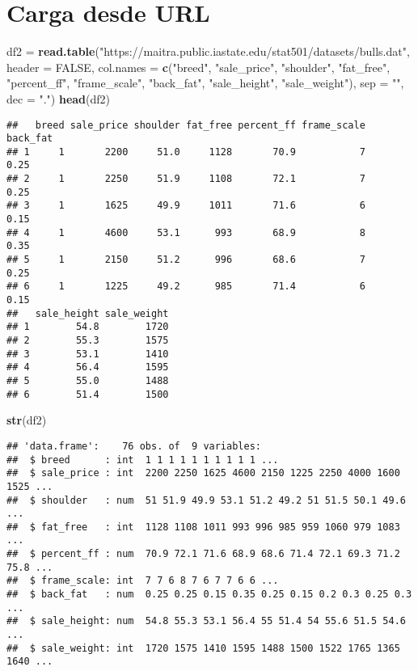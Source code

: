 \documentclass[
]{article}
\newenvironment{Shaded}{\begin{snugshade}}{\end{snugshade}}
\newcommand{\DataTypeTok}[1]{\textcolor[rgb]{0.13,0.29,0.53}{#1}}
\newcommand{\KeywordTok}[1]{\textcolor[rgb]{0.13,0.29,0.53}{\textbf{#1}}}
\newcommand{\NormalTok}[1]{#1}
\newcommand{\OtherTok}[1]{\textcolor[rgb]{0.56,0.35,0.01}{#1}}
\newcommand{\StringTok}[1]{\textcolor[rgb]{0.31,0.60,0.02}{#1}}
\begin{document}
\hypertarget{carga-desde-url}{%
\section{Carga desde URL}\label{carga-desde-url}}

\begin{Shaded}
\begin{Highlighting}[]
\NormalTok{df2 =}\StringTok{ }\KeywordTok{read.table}\NormalTok{(}\StringTok{"https://maitra.public.iastate.edu/stat501/datasets/bulls.dat"}\NormalTok{,}
                 \DataTypeTok{header =} \OtherTok{FALSE}\NormalTok{, }
                \DataTypeTok{col.names =} \KeywordTok{c}\NormalTok{(}\StringTok{"breed"}\NormalTok{, }\StringTok{"sale_price"}\NormalTok{, }\StringTok{"shoulder"}\NormalTok{,}
                          \StringTok{"fat_free"}\NormalTok{, }\StringTok{"percent_ff"}\NormalTok{, }\StringTok{"frame_scale"}\NormalTok{,}
                          \StringTok{"back_fat"}\NormalTok{, }\StringTok{"sale_height"}\NormalTok{, }\StringTok{"sale_weight"}\NormalTok{),}
                \DataTypeTok{sep =} \StringTok{""}\NormalTok{, }\DataTypeTok{dec =} \StringTok{"."}\NormalTok{)}
\KeywordTok{head}\NormalTok{(df2)}
\end{Highlighting}
\end{Shaded}

\begin{verbatim}
##   breed sale_price shoulder fat_free percent_ff frame_scale back_fat
## 1     1       2200     51.0     1128       70.9           7     0.25
## 2     1       2250     51.9     1108       72.1           7     0.25
## 3     1       1625     49.9     1011       71.6           6     0.15
## 4     1       4600     53.1      993       68.9           8     0.35
## 5     1       2150     51.2      996       68.6           7     0.25
## 6     1       1225     49.2      985       71.4           6     0.15
##   sale_height sale_weight
## 1        54.8        1720
## 2        55.3        1575
## 3        53.1        1410
## 4        56.4        1595
## 5        55.0        1488
## 6        51.4        1500
\end{verbatim}

\begin{Shaded}
\begin{Highlighting}[]
\KeywordTok{str}\NormalTok{(df2)}
\end{Highlighting}
\end{Shaded}

\begin{verbatim}
## 'data.frame':    76 obs. of  9 variables:
##  $ breed      : int  1 1 1 1 1 1 1 1 1 1 ...
##  $ sale_price : int  2200 2250 1625 4600 2150 1225 2250 4000 1600 1525 ...
##  $ shoulder   : num  51 51.9 49.9 53.1 51.2 49.2 51 51.5 50.1 49.6 ...
##  $ fat_free   : int  1128 1108 1011 993 996 985 959 1060 979 1083 ...
##  $ percent_ff : num  70.9 72.1 71.6 68.9 68.6 71.4 72.1 69.3 71.2 75.8 ...
##  $ frame_scale: int  7 7 6 8 7 6 7 7 6 6 ...
##  $ back_fat   : num  0.25 0.25 0.15 0.35 0.25 0.15 0.2 0.3 0.25 0.3 ...
##  $ sale_height: num  54.8 55.3 53.1 56.4 55 51.4 54 55.6 51.5 54.6 ...
##  $ sale_weight: int  1720 1575 1410 1595 1488 1500 1522 1765 1365 1640 ...
\end{verbatim}
\end{document}
